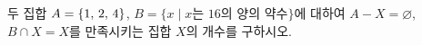두 집합 $A=\{1,\mkern3mu 2,\mkern3mu 4\}$, $B=\{x \mid x$는 $16$의 양의 약수$\}$에 대하여 $A-X=\varnothing$, $B\cap X=X$를 만족시키는 집합 $X$의 개수를 구하시오.
